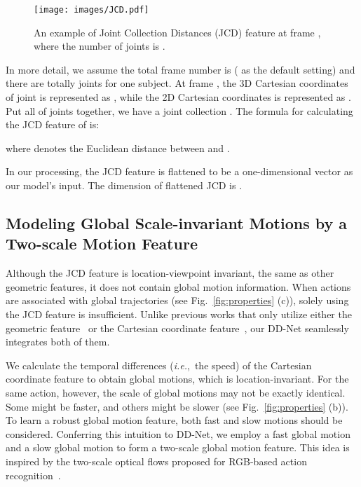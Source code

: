 \documentclass[journal]{IEEEtran}
\newcommand{\ie}{{\it i.e.}}
\begin{document}
\begin{figure}[!ht]
\centering
  \texttt{[image: images/JCD.pdf]}
  \caption{An example of Joint Collection Distances (JCD) feature at frame , where the number of joints is .}
  \label{fig:JCD}
\end{figure}

In more detail, we assume the total frame number is  ( as the default setting) and there are totally  joints for one subject. At frame , the 3D Cartesian coordinates of joint  is represented as , while the 2D Cartesian coordinates is represented as . Put all of joints together, we have a joint collection . The formula for calculating the JCD feature of  is:

where  denotes the Euclidean distance between  and . 

In our processing, the JCD feature is flattened to be a one-dimensional vector as our model's input. The dimension of flattened JCD is . 

\subsection{Modeling Global Scale-invariant Motions by a Two-scale Motion Feature}

Although the JCD feature is location-viewpoint invariant, the same as other geometric features, it does not contain global motion information. When actions are associated with global trajectories (see Fig.~\textcolor{red}{\ref{fig:properties}} (c)), solely using the JCD feature is insufficient. Unlike previous works that only utilize either the geometric feature~\cite{chen2011learning,zhang2018fusing} or the Cartesian coordinate feature~\cite{Li2017Joint, lee2017ensemble, tang2018deep, yang2018action}, our DD-Net seamlessly integrates both of them. 

We calculate the temporal differences (\ie,~the speed) of the Cartesian coordinate feature to obtain global motions, which is location-invariant. For the same action, however, the scale of global motions may not be exactly identical. Some might be faster, and others might be slower (see Fig.~\textcolor{red}{\ref{fig:properties}} (b)). To learn a robust global motion feature, both fast and slow motions should be considered. Conferring this intuition to DD-Net, we employ a fast global motion and a slow global motion to form a two-scale global motion feature. This idea is inspired by the two-scale optical flows proposed for RGB-based action recognition~\cite{feichtenhofer2018slowfast}.
\end{document}
